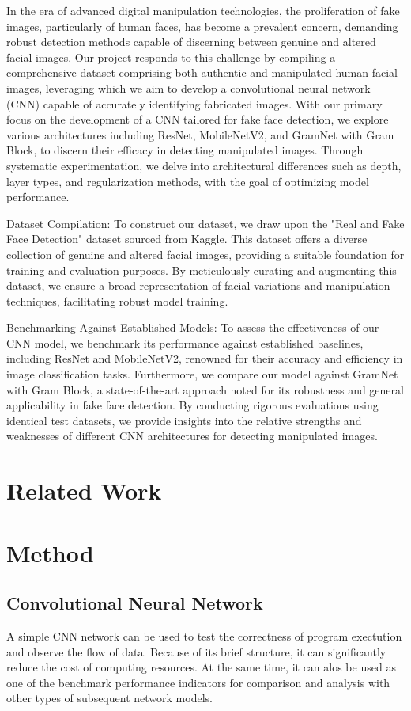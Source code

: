 \documentclass[rebuttal]{cvpr}
\begin{document}
In the era of advanced digital manipulation technologies, the proliferation of fake images, particularly of human faces, has become a prevalent concern, demanding robust detection methods capable of discerning between genuine and altered facial images. Our project responds to this challenge by compiling a comprehensive dataset comprising both authentic and manipulated human facial images, leveraging which we aim to develop a convolutional neural network (CNN) capable of accurately identifying fabricated images. With our primary focus on the development of a CNN tailored for fake face detection, we explore various architectures including ResNet, MobileNetV2, and GramNet with Gram Block, to discern their efficacy in detecting manipulated images. Through systematic experimentation, we delve into architectural differences such as depth, layer types, and regularization methods, with the goal of optimizing model performance.
 
Dataset Compilation:
To construct our dataset, we draw upon the "Real and Fake Face Detection" dataset sourced from Kaggle. This dataset offers a diverse collection of genuine and altered facial images, providing a suitable foundation for training and evaluation purposes. By meticulously curating and augmenting this dataset, we ensure a broad representation of facial variations and manipulation techniques, facilitating robust model training.
 
Benchmarking Against Established Models:
To assess the effectiveness of our CNN model, we benchmark its performance against established baselines, including ResNet and MobileNetV2, renowned for their accuracy and efficiency in image classification tasks. Furthermore, we compare our model against GramNet with Gram Block, a state-of-the-art approach noted for its robustness and general applicability in fake face detection. By conducting rigorous evaluations using identical test datasets, we provide insights into the relative strengths and weaknesses of different CNN architectures for detecting manipulated images.

\section{Related Work}
\section{Method}

\subsection{Convolutional Neural Network}
A simple CNN network can be used to test the correctness of program exectution and observe the flow of data. Because of its brief structure, it can significantly reduce the cost of computing resources. At the same time, it can alos be used as one of the benchmark performance indicators for comparison and analysis with other types of subsequent network models.
\end{document}
